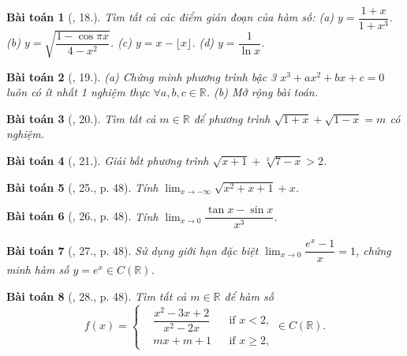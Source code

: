 \documentclass{article}
\newtheorem{baitoan}{Bài toán}
\begin{document}
\begin{baitoan}[\cite{TLCT_dai_so_giai_tich_11}, 18.]
	Tìm tất cả các điểm gián đoạn của hàm số: (a) $y = \dfrac{1 + x}{1 + x^3}$. (b) $y = \sqrt{\dfrac{1 - \cos\pi x}{4 - x^2}}$. (c) $y = x - \lfloor x\rfloor$. (d) $y = \dfrac{1}{\ln x}$.
\end{baitoan}

\begin{baitoan}[\cite{TLCT_dai_so_giai_tich_11}, 19.]
	(a) Chứng minh phương trình bậc 3 $x^3 + ax^2 + bx + c = 0$ luôn có ít nhất 1 nghiệm thực $\forall a,b,c\in\mathbb{R}$. (b) Mở rộng bài toán.
\end{baitoan}

\begin{baitoan}[\cite{TLCT_dai_so_giai_tich_11}, 20.]
	Tìm tất cả $m\in\mathbb{R}$ để phương trình $\sqrt{1 + x} + \sqrt{1 - x} = m$ có nghiệm.
\end{baitoan}

\begin{baitoan}[\cite{TLCT_dai_so_giai_tich_11}, 21.]
	Giải bất phương trình $\sqrt{x + 1} + \sqrt[3]{7 - x} > 2$.
\end{baitoan}

\begin{baitoan}[\cite{TLCT_BT_dai_so_giai_tich_11}, 25., p. 48]
	Tính $\lim_{x\to-\infty} \sqrt{x^2 + x + 1} + x$.
\end{baitoan}

\begin{baitoan}[\cite{TLCT_BT_dai_so_giai_tich_11}, 26., p. 48]
	Tính $\lim_{x\to0} \dfrac{\tan x - \sin x}{x^3}$.
\end{baitoan}

\begin{baitoan}[\cite{TLCT_BT_dai_so_giai_tich_11}, 27., p. 48]
	Sử dụng giới hạn đặc biệt $\lim_{x\to0} \dfrac{e^x - 1}{x} = 1$, chứng minh hàm số $y = e^x\in C(\mathbb{R})$.
\end{baitoan}

\begin{baitoan}[\cite{TLCT_BT_dai_so_giai_tich_11}, 28., p. 48]
	Tìm tất cả $m\in\mathbb{R}$ để hàm số
	\begin{equation*}
		f(x) = \left\{\begin{split}
			&\dfrac{x^2 - 3x + 2}{x^2 - 2x}&&\mbox{if } x < 2,\\
			&mx + m + 1&&\mbox{if } x\ge2,
		\end{split}\right.\in C(\mathbb{R}).
	\end{equation*}
\end{baitoan}
\end{document}
